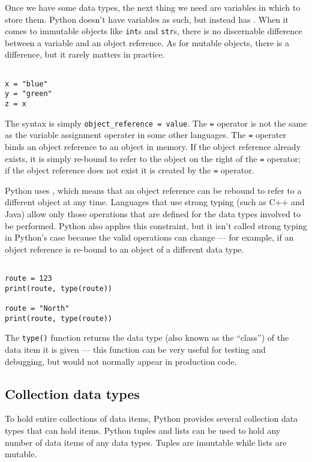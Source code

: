 Once we have some data types, the next thing we need are variables in which to store them. 
Python doesn't have variables as such, but instead has .
When it comes to immutable objects like \verb|int|s and \verb|str|s, there is no discernable difference between a variable and an object reference.
As for mutable objects, there is a difference, but it rarely matters in practice.



\begin{lstlisting}

x = "blue"
y = "green"
z = x
\end{lstlisting}


The syntax is simply \verb|object_reference = value|.
The \verb|=| operator is not the same as the variable assignment operater in some other languages.
The \verb|=| operater binds an object reference to an object in memory.
If the object reference already exists, it is simply re-bound to refer to the object on the right of the \verb|=| operator;
if the object reference does not exist it is created by the \verb|=| operator.


Python uses , which means that an object reference can be rebound to refer to a different object at any time.
Languages that use strong typing (such as C++ and Java) allow only those operations that are defined for the data types involved to be performed.
Python also applies this constraint, but it isn’t called strong typing in Python’s case because the valid operations can change --- for example, if an object reference is re-bound to an object of a different data type.

\begin{lstlisting}

route = 123
print(route, type(route))

route = "North"
print(route, type(route))
\end{lstlisting}



The \verb|type()| function returns the data type (also known as the ``class'') of the data item it is given --- this function can be very useful for testing and debugging, but would not normally appear in production code.


\subsection{Collection data types}

To hold entire collections of data items, Python provides several collection data types that can hold items.
Python tuples and lists can be used to hold any number of data items of any data types.
Tuples are imuutable while lists are mutable.


